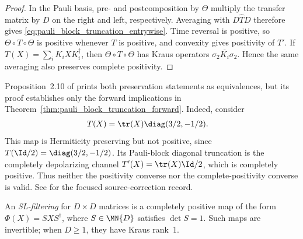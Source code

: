 \begin{proof}\leanok
    In the Pauli basis, pre- and postcomposition by $\Theta$ multiply the
    transfer matrix by $D$ on the right and left, respectively.  Averaging
    with $D\widehat T D$ therefore gives
    \eqref{eq:pauli_block_truncation_entrywise}.  Time reversal is positive,
    so $\Theta\circ T\circ\Theta$ is positive whenever $T$ is positive, and
    convexity gives positivity of $T'$.  If
    $T(X)=\sum_iK_iXK_i^\dagger$, then
    $\Theta\circ T\circ\Theta$ has Kraus operators
    $\sigma_2\overline{K_i}\sigma_2$.  Hence the same averaging also
    preserves complete positivity.
\end{proof}

\begin{remark}
    \label{rem:pauli_block_truncation_converse}
    Proposition~2.10 of \cite{Wolf2012Quantum} prints both preservation
    statements as equivalences, but its proof establishes only the forward
    implications in Theorem~\ref{thm:pauli_block_truncation_forward}.  Indeed,
    consider
    \begin{align}
        T(X)&=\tr(X)\diag(3/2,-1/2).
        \label{eq:pauli_block_truncation_counterexample}
    \end{align}
    This map is Hermiticity preserving but not positive, since
    $T(\Id/2)=\diag(3/2,-1/2)$.  Its Pauli-block diagonal truncation is the
    completely depolarizing channel
    $T'(X)=\tr(X)\Id/2$, which is completely positive.  Thus neither the
    positivity converse nor the complete-positivity converse is valid.  See
     for the
    focused source-correction record.
\end{remark}

\begin{definition}\label{def:sl_filtering}
    \leanok
    An \emph{SL-filtering} for $D \times D$ matrices is a completely
    positive map of the form $\Phi(X)=SXS^{\dagger}$, where
    $S \in \MN{D}$ satisfies $\det S=1$. Such maps are invertible; when
    $D\geq1$, they have Kraus rank~1.
\end{definition}


